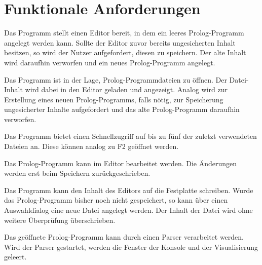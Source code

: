 \documentclass[parskip=full,11pt,twoside]{scrartcl}
\begin{document}
\section{Funktionale Anforderungen}


Das Programm stellt einen Editor bereit, in dem ein leeres Prolog-Programm angelegt werden kann. Sollte der Editor zuvor bereits ungesicherten Inhalt besitzen, so wird der Nutzer aufgefordert, diesen zu speichern. Der alte Inhalt wird daraufhin verworfen und ein neues Prolog-Programm angelegt.


Das Programm ist in der Lage, Prolog-Programmdateien zu öffnen. Der Datei-Inhalt wird dabei in den Editor geladen und angezeigt. Analog wird zur Erstellung eines neuen Prolog-Programms, falls nötig, zur Speicherung ungesicherter Inhalte aufgefordert und das alte Prolog-Programm daraufhin verworfen.


Das Programm bietet einen Schnellzugriff auf bis zu fünf der zuletzt verwendeten Dateien an. Diese können analog zu F2 geöffnet werden.


Das Prolog-Programm kann im Editor bearbeitet werden. Die Änderungen werden erst beim Speichern zurückgeschrieben.


Das Programm kann den Inhalt des Editors auf die Festplatte schreiben. Wurde das Prolog-Programm bisher noch nicht gespeichert, so kann über einen Auswahldialog eine neue Datei angelegt werden. Der Inhalt der Datei wird ohne weitere Überprüfung überschrieben.


Das geöffnete Prolog-Programm kann durch einen Parser verarbeitet werden. Wird der Parser gestartet, werden die Fenster der Konsole und der Visualisierung geleert.

\end{document}
